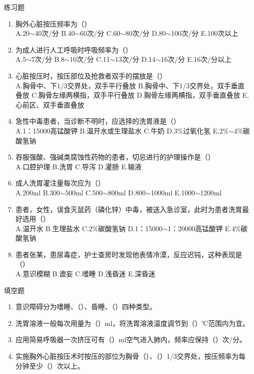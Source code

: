 \documentclass[11pt, a4paper]{ctexart}
\begin{document}
\begin{examplebox}{练习题}
	\begin{enumerate}
		\item 胸外心脏按压频率为（\qquad）\\
		      A.20$\sim$40次/分 \quad B.40$\sim$60次/分 \quad C.60$\sim$80次/分 \quad D.80$\sim$100次/分 \quad E.100次以上
		\item 为成人进行人工呼吸时呼吸频率为（\qquad）\\
		      A.5$\sim$7次/分 \quad B.8$\sim$10次/分 \quad C.11$\sim$13次/分 \quad D.14$\sim$16次/分 \quad E.16次/分以上
		\item 心脏按压时，按压部位及抢救者双手的摆放是（\qquad）\\
		      A.胸骨中、下1/3交界处，双手平行叠放 \quad B.胸骨中、下1/3交界处，双手垂直叠放 \quad C.胸骨左缘两横指，双手平行叠放 \quad D.胸骨左缘两横指，双手垂直叠放 \quad E.心前区、双手垂直叠放
		\item 急性中毒患者，当诊断不明时，应选择的洗胃液是（\qquad）\\
		      A.1：15000高锰酸钾 \quad B.温开水或生理盐水 \quad C.牛奶 \quad D.3\%过氧化氢 \quad E.2\%$\sim$4\%碳酸氢钠
		\item 吞服强酸、强碱类腐蚀性药物的患者，切忌进行的护理操作是（\qquad）\\
		      A.口腔护理 \quad B.洗胃 \quad C.导泻 \quad D.灌肠 \quad E.输液
		\item 成人洗胃灌注量每次应为（\qquad）\\
		      A.200ml \quad B.300$\sim$500ml \quad C.500$\sim$800ml \quad D.800$\sim$1000ml \quad E.1000$\sim$1200ml
		\item 患者，女性，误食灭鼠药（磷化锌）中毒，被送入急诊室，此时为患者洗胃最好选用（\qquad）\\
		      A.温开水 \quad B.生理盐水 \quad C.2\%碳酸氢钠 \quad D.1：15000$\sim$1：20000高锰酸钾 \quad E.4\%碳酸氢钠
		\item 患者张某，患尿毒症，护士查房时发现他表情冷漠，反应迟钝，这种表现是（\qquad）\\
		      A.意识模糊 \quad B.谵妄 \quad C.嗜睡 \quad D.浅昏迷 \quad E.深昏迷
	\end{enumerate}
\end{examplebox}

\begin{tipsbox}{填空题}
	\begin{enumerate}
		\item 意识障碍分为嗜睡、（\qquad）、昏睡、（\qquad）四种类型。
		\item 洗胃溶液一般每次用量为（\qquad）ml，将洗胃溶液温度调节到（\qquad）℃范围内为宜。
		\item 应用简易呼吸器一次挤压可有（\qquad）ml空气进入肺内，频率应保持（\qquad）次/分。
		\item 实施胸外心脏按压术时按压的部位为胸骨（\qquad）、（\qquad）1/3交界处，按压频率为每分钟至少（\qquad）次以上。
	\end{enumerate}
\end{tipsbox}
\end{document}
